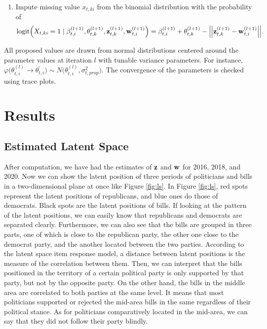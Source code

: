 \documentclass[a4paper, 11pt]{report}
\begin{document}
\begin{enumerate}
\item Impute missing value $x_{t,ki}$ from the binomial distribution with the probability of
\begin{equation*}
    \mbox{logit}\Big(X_{t,ki} = 1 \mid \beta_{t,i}^{(l+1)}, \theta_{t,k}^{(l+1)}, {\bf z}_{t,k}^{(l+1)}, {\bf w}_{t,i}^{(l+1)}\Big)
    = \beta_{t,i}^{(l+1)} + \theta_{t,k}^{(l+1)} - \Big|\Big|{\bf z}_{t,k}^{(l+1)} - {\bf w}_{t,i}^{(l+1)}\Big|\Big|.
\end{equation*}

\end{enumerate}

\quad All proposed values are drawn from normal distributions centered around the parameter values at iteration $l$ with tunable variance parameters. For instance, $\varphi \big(\theta_{t,i}^{(l)} \rightarrow \theta_{t,i}^{\prime}\big) \sim N\big(\theta_{t,i}^{(l)}, \sigma^2_{t,prop} \big)$. The convergence of the parameters is checked using trace plots.







\chapter{Results} \label{Chapter6}
\section{Estimated Latent Space}

\quad After computation, we have had the estimates of $\bf{z}$ and $\bf{w}$ for 2016, 2018, and 2020. Now we can show the latent position of three periods of politicians and bills in a two-dimensional plane at once like Figure \ref{fig:ls}. In Figure \ref{fig:ls}, red spots represent the latent positions of republicans, and blue ones do those of democrats. Black spots are the latent positions of bills. If looking at the pattern of the latent positions,
we can easily know that republicans and democrats are separated clearly. Furthermore, we can also see that the bills are grouped in three parts, one of which is close to the republican party, the other one close to the democrat party, and the another located between the two parties. According to the latent space item response model, a distance between latent positions is the measure of the correlation between them. Then, we can interpret that the bills positioned in the territory of a certain political party is only supported by that party, but not by the opposite party. On the other hand, the bills in the middle area are correlated to both parties at the same level. It means that most politicians supported or rejected the mid-area bills in the same regardless of their political stance. As for politicians comparatively located in the mid-area, we can say that they did not follow their party blindly.
\end{document}
